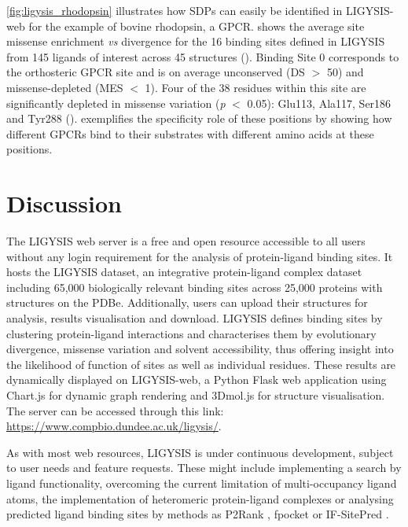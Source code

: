 \autoref{fig:ligysis_rhodopsin} illustrates how SDPs can easily be identified in LIGYSIS-web for the example of bovine rhodopsin, a GPCR.  shows the average site missense enrichment \textit{vs} divergence for the 16 binding sites defined in LIGYSIS from 145 ligands of interest across 45 structures (). Binding Site 0 corresponds to the orthosteric GPCR site and is on average unconserved (DS $>$ 50) and missense-depleted (MES $<$ 1). Four of the 38 residues within this site are significantly depleted in missense variation (\textit{p} $<$ 0.05): Glu113, Ala117, Ser186 and Tyr288 ().  exemplifies the specificity role of these positions by showing how different GPCRs bind to their substrates with different amino acids at these positions.

\section{Discussion}

The LIGYSIS web server is a free and open resource accessible to all users without any login requirement for the analysis of protein-ligand binding sites. It hosts the LIGYSIS dataset, an integrative protein-ligand complex dataset including 65,000 biologically relevant binding sites across 25,000 proteins with structures on the PDBe. Additionally, users can upload their structures for analysis, results visualisation and download. LIGYSIS defines binding sites by clustering protein-ligand interactions and characterises them by evolutionary divergence, missense variation and solvent accessibility, thus offering insight into the likelihood of function of sites as well as individual residues. These results are dynamically displayed on LIGYSIS-web, a Python Flask web application using Chart.js for dynamic graph rendering and 3Dmol.js for structure visualisation. The server can be accessed through this link: \url{https://www.compbio.dundee.ac.uk/ligysis/}.

As with most web resources, LIGYSIS is under continuous development, subject to user needs and feature requests. These might include implementing a search by ligand functionality, overcoming the current limitation of multi-occupancy ligand atoms, the implementation of heteromeric protein-ligand complexes or analysing predicted ligand binding sites by methods as P2Rank \cite{KRIVAK_2018_P2RANK}, fpocket \cite{GUILLOUX_2009_FPOCKET} or IF-SitePred \cite{CARBERY_2024_IFSP}.

